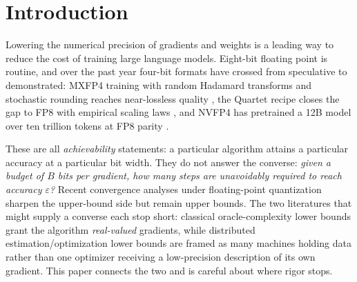 \documentclass[11pt]{article}
\theoremstyle{definition}
\newcommand{\eps}{\varepsilon}
\begin{document}
\section{Introduction}
\label{sec:intro}

Lowering the numerical precision of gradients and weights is a leading way to reduce the cost of
training large language models. Eight-bit floating point is routine, and over the past year
four-bit formats have crossed from speculative to demonstrated: MXFP4 training with random Hadamard
transforms and stochastic rounding reaches near-lossless quality \citep{tseng2025mxfp4}, the Quartet
recipe closes the gap to FP8 with empirical scaling laws \citep{castro2025quartet}, and NVFP4 has
pretrained a 12B model over ten trillion tokens at FP8 parity \citep{nvidia2025nvfp4}.

These are all \emph{achievability} statements: a particular algorithm attains a particular accuracy at
a particular bit width. They do not answer the converse: \emph{given a budget of $B$ bits per gradient,
how many steps are unavoidably required to reach accuracy $\eps$?} Recent convergence analyses under
floating-point quantization \citep{tang2025adaptive} sharpen the upper-bound side but remain upper
bounds. The two literatures that might supply a converse each stop short: classical oracle-complexity
lower bounds \citep{nemirovski1983problem,agarwal2012lower,carmon2020stationary,arjevani2023nonconvex,braun2017nonsmooth}
grant the algorithm \emph{real-valued} gradients, while distributed estimation/optimization lower
bounds \citep{zhang2013distributed,braverman2016ddpi,han2018geometric,arjevani2015communication} are
framed as many machines holding data rather than one optimizer receiving a low-precision description
of its own gradient. This paper connects the two and is careful about where rigor stops.
\end{document}
